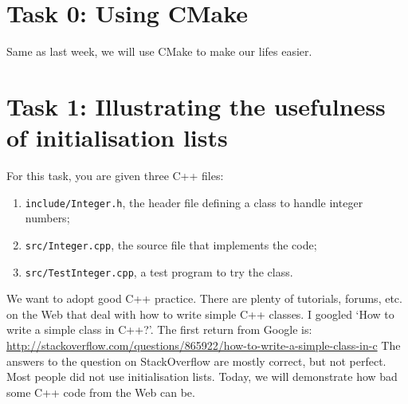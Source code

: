 \section{Task 0: Using CMake}

Same as last week, we will use CMake to make our lifes easier. 

\section{Task 1: Illustrating the usefulness of initialisation lists}

For this task, you are given three C++ files:
\begin{enumerate}
  \item \verb+include/Integer.h+, the header file defining a class to handle integer numbers;
  \item \verb+src/Integer.cpp+, the source file that implements the code;
  \item \verb+src/TestInteger.cpp+, a test program to try the class.
\end{enumerate}
We want to adopt good C++ practice. 
There are plenty of tutorials, forums, etc. on the Web that deal with how to write simple C++ classes. 
I googled `How to write a simple class in C++?'. 
The first return from Google is: \url{http://stackoverflow.com/questions/865922/how-to-write-a-simple-class-in-c}
The answers to the question on StackOverflow are mostly correct, but not perfect. 
Most people did not use initialisation lists. 
Today, we will demonstrate how bad some C++ code from the Web can be. 

